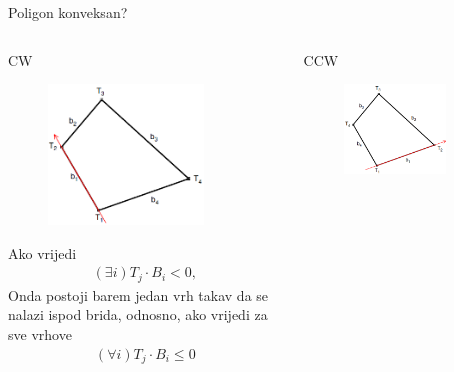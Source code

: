 \documentclass[9pt]{beamer}
\begin{document}
\begin{frame}{Poligon konveksan?}
\begin{columns}
	\begin{column}[t]{0.5\textwidth}
		CW
		\begin{figure}
			\centering
			\includegraphics[width=0.8\textwidth]{slike/poligon_cw.png}
		\end{figure}
	Ako vrijedi 
	\begin{align*}
	(\exists i) T_j \cdot B_i < 0 ,
	\end{align*}
	Onda postoji barem jedan vrh takav da se nalazi ispod brida, odnosno, ako vrijedi za sve vrhove
		\begin{align*}
		(\forall i) T_j \cdot B_i \leq 0 
		\end{align*}
	\end{column}
	\begin{column}[t]{0.5\textwidth}
		CCW
		\begin{figure}
			\centering		
			\includegraphics[width=0.8\textwidth]{slike/poligon_ccw.png}

\end{figure}
\end{column}
\end{columns}
\end{frame}
\end{document}
